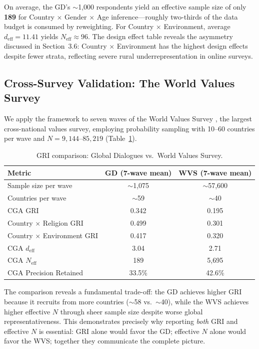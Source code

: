 \documentclass[11pt,a4paper]{article}
\begin{document}
On average, the GD's $\sim$1,000 respondents yield an effective sample size of only \textbf{189} for Country $\times$ Gender $\times$ Age inference---roughly two-thirds of the data budget is consumed by reweighting. For Country $\times$ Environment, average $d_{\text{eff}} = 11.41$ yields $N_{\text{eff}} \approx 96$. The design effect table reveals the asymmetry discussed in Section~3.6: Country $\times$ Environment has the highest design effects despite fewer strata, reflecting severe rural underrepresentation in online surveys.

\subsection{Cross-Survey Validation: The World Values Survey}\label{sec:wvs}

We apply the framework to seven waves of the World Values Survey \citep{haerpfer2022wvs}, the largest cross-national values survey, employing probability sampling with 10--60 countries per wave and $N = 9{,}144$--$85{,}219$ (Table~\ref{tab:wvs_comparison}).

\begin{table}[ht]
\centering
\caption{GRI comparison: Global Dialogues vs.\ World Values Survey.}
\label{tab:wvs_comparison}
\begin{tabular}{@{}lcc@{}}
\toprule
Metric & GD (7-wave mean) & WVS (7-wave mean) \\
\midrule
Sample size per wave & $\sim$1,075 & $\sim$57,600 \\
Countries per wave & $\sim$59 & $\sim$40 \\
CGA GRI & 0.342 & 0.195 \\
Country $\times$ Religion GRI & 0.499 & 0.301 \\
Country $\times$ Environment GRI & 0.417 & 0.320 \\
CGA $d_{\text{eff}}$ & 3.04 & 2.71 \\
CGA $N_{\text{eff}}$ & 189 & 5,695 \\
CGA Precision Retained & 33.5\% & 42.6\% \\
\bottomrule
\end{tabular}
\end{table}

The comparison reveals a fundamental trade-off: the GD achieves higher GRI because it recruits from more countries ($\sim$58 vs.\ $\sim$40), while the WVS achieves higher effective $N$ through sheer sample size despite worse global representativeness. This demonstrates precisely why reporting \emph{both} GRI and effective $N$ is essential: GRI alone would favor the GD; effective $N$ alone would favor the WVS; together they communicate the complete picture.
\end{document}
